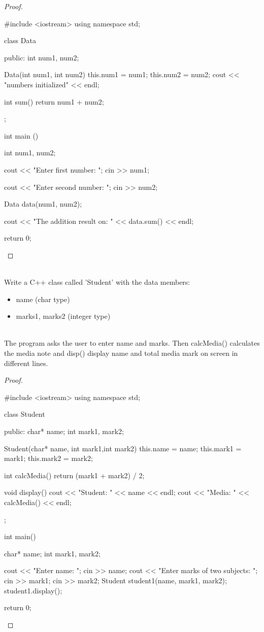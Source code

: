 \documentclass[12pt]{article}
\newenvironment{problem}[2][Problem]{\begin{trivlist}
\item[\hskip \labelsep {\bfseries #1}\hskip \labelsep {\bfseries #2.}]}{\end{trivlist}}
\begin{document}
\begin{proof}
\begin{cppcode}[]
#include <iostream>
using namespace std;

class Data
{
    public:
        int num1, num2;

        Data(int num1, int num2)
        {
            this.num1 = num1;
            this.num2 = num2;
            cout << "numbers initialized" << endl;
        }

        int sum()
        {
            return num1 + num2;
        }
};

int main ()
{
    int num1, num2;

    cout << "Enter first number: ";
    cin >> num1;

    cout << "Enter second number: ";
    cin >> num2;

    Data data(num1, num2);

    cout << "The addition result on: " << data.sum() << endl;

    return 0;
}
\end{cppcode}
\end{proof}
\pagebreak


\begin{problem}{3}
\text{ }\\
Write a C++ class called 'Student' with the data members:
\begin{itemize}
    \item name (char type)
    \item marks1, marks2 (integer type)
\end{itemize}

\text{ }\\
The program asks the user to enter name and marks. Then calcMedia() calculates the media note and disp() display name and total media mark on screen in different lines.
\end{problem}

\begin{proof}
\begin{cppcode}[]
#include <iostream>
using namespace std;

class Student
{
    public:
        char* name;
        int mark1, mark2;

        Student(char* name, int mark1,int mark2)
        {
            this.name = name;
            this.mark1 = mark1;
            this.mark2 = mark2;
        }

        int calcMedia()
        {
            return (mark1 + mark2) / 2;
        }

        void display()
        {
            cout << "Student: " << name << endl;
            cout << "Media: " << calcMedia() << endl;
        }
};

int main()
{
    char* name;
    int mark1, mark2;

    cout << "Enter name: ";
    cin >> name;
    cout << "Enter marks of two subjects: ";
    cin >> mark1;
    cin >> mark2;
    Student student1(name, mark1, mark2);
    student1.display();

    return 0;
}
\end{cppcode}
\end{proof}
\pagebreak
\end{document}
